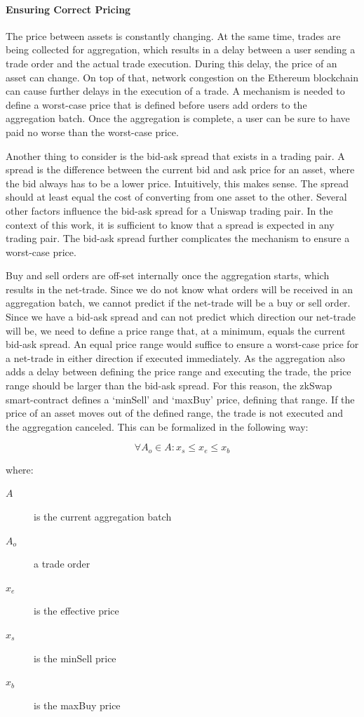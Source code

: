 \documentclass[../../thesis.tex]{subfiles}
\begin{document}
\paragraph{Ensuring Correct Pricing}
The price between assets is constantly changing. At the same time, trades are being collected for aggregation, which results in a delay between a user sending a trade order and the actual trade execution. During this delay, the price of an asset can change. On top of that, network congestion on the Ethereum blockchain can cause further delays in the execution of a trade. A mechanism is needed to define a worst-case price that is defined before users add orders to the aggregation batch. Once the aggregation is complete, a user can be sure to have paid no worse than the worst-case price.

Another thing to consider is the bid-ask spread that exists in a trading pair. A spread is the difference between the current bid and ask price for an asset, where the bid always has to be a lower price. Intuitively, this makes sense. The spread should at least equal the cost of converting from one asset to the other. Several other factors influence the bid-ask spread for a Uniswap trading pair. In the context of this work, it is sufficient to know that a spread is expected in any trading pair. The bid-ask spread further complicates the mechanism to ensure a worst-case price. 

Buy and sell orders are off-set internally once the aggregation starts, which results in the net-trade. Since we do not know what orders will be received in an aggregation batch, we cannot predict if the net-trade will be a buy or sell order. Since we have a bid-ask spread and can not predict which direction our net-trade will be, we need to define a price range that, at a minimum, equals the current bid-ask spread. An equal price range would suffice to ensure a worst-case price for a net-trade in either direction if executed immediately.
As the aggregation also adds a delay between defining the price range and executing the trade, the price range should be larger than the bid-ask spread. For this reason, the zkSwap smart-contract defines a `minSell' and `maxBuy' price, defining that range. If the price of an asset moves out of the defined range, the trade is not executed and the aggregation canceled. This can be formalized in the following way: 

$$\forall A_o\in A: x_s \leq x_e \leq x_b$$


where:
\begin{description}
\item[$A$] is the current aggregation batch
\item[$A_o$] a trade order
\item[$x_e$] is the effective price 
\item[$x_s$] is the minSell price
\item[$x_b$] is the maxBuy price 
\end{description}
\end{document}
